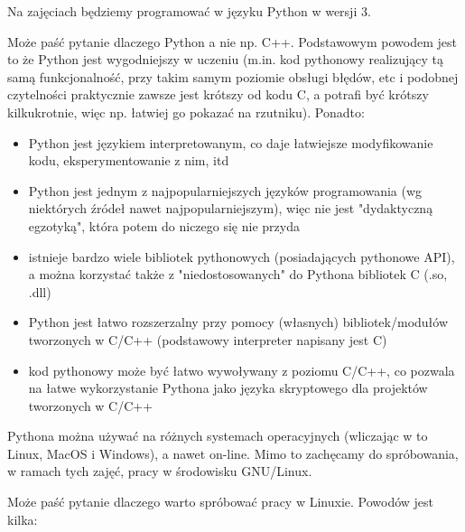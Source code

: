 \documentclass{pdfBooklets}
\begin{document}
Na zajęciach będziemy programować w języku Python w wersji 3.
\begin{teacherOnly}
Może paść pytanie dlaczego Python a nie np. C++.
Podstawowym powodem jest to że Python jest wygodniejszy w uczeniu (m.in. kod pythonowy realizujący tą samą funkcjonalność, przy takim samym poziomie obsługi błędów, etc
i podobnej czytelności praktycznie zawsze jest krótszy od kodu C, a potrafi być krótszy kilkukrotnie, więc np. łatwiej go pokazać na rzutniku).
Ponadto:
\begin{itemize}
\item Python jest językiem interpretowanym, co daje łatwiejsze modyfikowanie kodu, eksperymentowanie z nim, itd
\item Python jest jednym z najpopularniejszych języków programowania (wg niektórych źródeł nawet najpopularniejszym), więc nie jest "dydaktyczną egzotyką", która potem do niczego się nie przyda
\item istnieje bardzo wiele bibliotek pythonowych (posiadających pythonowe API), a można korzystać także z "niedostosowanych" do Pythona bibliotek C (.so, .dll)
\item Python jest łatwo rozszerzalny przy pomocy (własnych) bibliotek/modułów tworzonych w C/C++ (podstawowy interpreter napisany jest C)
\item kod pythonowy może być łatwo wywoływany z poziomu C/C++, co pozwala na łatwe wykorzystanie Pythona jako języka skryptowego dla projektów tworzonych w C/C++
\end{itemize}

\noindent
\end{teacherOnly}
%
Pythona można używać na różnych systemach operacyjnych (wliczając w to Linux, MacOS i Windows), a nawet on-line.
Mimo to zachęcamy do spróbowania, w ramach tych zajęć, pracy w środowisku GNU/Linux.
%
\begin{teacherOnly}

Może paść pytanie dlaczego warto spróbować pracy w Linuxie. Powodów jest kilka:
\end{teacherOnly}
\end{document}
